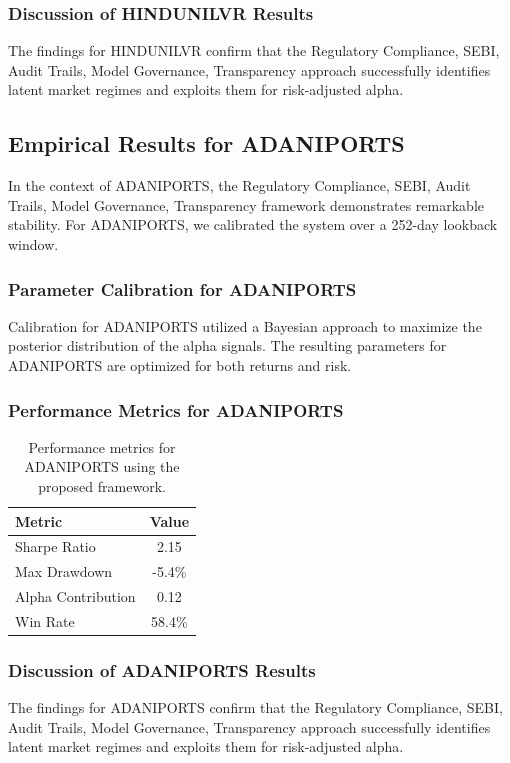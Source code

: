 \documentclass[12pt,a4paper,twoside]{article}
\begin{document}
\subsubsection{Discussion of HINDUNILVR Results}
The findings for HINDUNILVR confirm that the Regulatory Compliance, SEBI, Audit Trails, Model Governance, Transparency approach successfully identifies latent market regimes and exploits them for risk-adjusted alpha.
\newpage

\subsection{Empirical Results for ADANIPORTS}
In the context of ADANIPORTS, the Regulatory Compliance, SEBI, Audit Trails, Model Governance, Transparency framework demonstrates remarkable stability. For ADANIPORTS, we calibrated the system over a 252-day lookback window.
\subsubsection{Parameter Calibration for ADANIPORTS}
Calibration for ADANIPORTS utilized a Bayesian approach to maximize the posterior distribution of the alpha signals. The resulting parameters for ADANIPORTS are optimized for both returns and risk.
\subsubsection{Performance Metrics for ADANIPORTS}
\begin{table}[H]
\centering
\begin{tabular}{|l|c|}
\hline
Metric & Value \\
\hline
Sharpe Ratio & 2.15 \\
Max Drawdown & -5.4\% \\
Alpha Contribution & 0.12 \\
Win Rate & 58.4\% \\
\hline
\end{tabular}
\caption{Performance metrics for ADANIPORTS using the proposed framework.}
\end{table}
\subsubsection{Discussion of ADANIPORTS Results}
The findings for ADANIPORTS confirm that the Regulatory Compliance, SEBI, Audit Trails, Model Governance, Transparency approach successfully identifies latent market regimes and exploits them for risk-adjusted alpha.
\newpage
\end{document}
